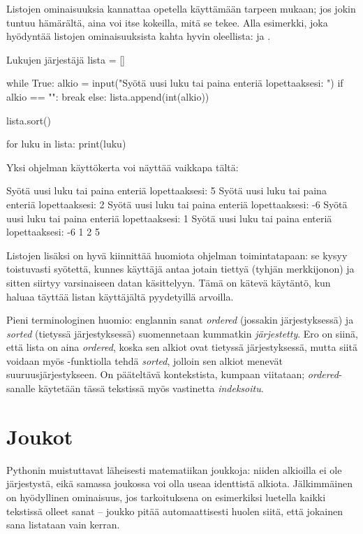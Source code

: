 Listojen ominaisuuksia kannattaa opetella käyttämään tarpeen mukaan; jos jokin tuntuu hämärältä, aina voi itse kokeilla, mitä se tekee. Alla esimerkki, joka hyödyntää listojen ominaisuuksista kahta hyvin oleellista:  ja .

\begin{example}{Lukujen järjestäjä}
lista = []

while True:
	alkio = input("Syötä uusi luku tai paina enteriä lopettaaksesi: ")
	if alkio == "":
		break
	else:
		lista.append(int(alkio))

lista.sort()

for luku in lista:
	print(luku)
\end{example}

Yksi ohjelman käyttökerta voi näyttää vaikkapa tältä:

\begin{output}
Syötä uusi luku tai paina enteriä lopettaaksesi: 5
Syötä uusi luku tai paina enteriä lopettaaksesi: 2
Syötä uusi luku tai paina enteriä lopettaaksesi: -6
Syötä uusi luku tai paina enteriä lopettaaksesi: 1
Syötä uusi luku tai paina enteriä lopettaaksesi: 
-6
1
2
5
\end{output}

Listojen lisäksi on hyvä kiinnittää huomiota ohjelman toimintatapaan: se kysyy toistuvasti syötettä, kunnes käyttäjä antaa jotain tiettyä (tyhjän merkkijonon) ja sitten siirtyy varsinaiseen datan käsittelyyn. Tämä on kätevä käytäntö, kun haluaa täyttää listan käyttäjältä pyydetyillä arvoilla.

Pieni terminologinen huomio: englannin sanat \textit{ordered} (jossakin järjestyksessä) ja \textit{sorted} (tietyssä järjestyksessä) suomennetaan kummatkin \textit{järjestetty}. Ero on siinä, että lista on aina \textit{ordered}, koska sen alkiot ovat tietyssä järjestyksessä, mutta siitä voidaan myös -funktiolla tehdä \textit{sorted}, jolloin sen alkiot menevät suuruusjärjestykseen. On pääteltävä kontekstista, kumpaan viitataan; \textit{ordered}-sanalle käytetään tässä tekstissä myös vastinetta \textit{indeksoitu}.

\section{Joukot}

Pythonin  muistuttavat läheisesti matematiikan joukkoja: niiden alkioilla ei ole järjestystä, eikä samassa joukossa voi olla useaa identtistä alkiota. Jälkimmäinen on hyödyllinen ominaisuus, jos tarkoituksena on esimerkiksi luetella kaikki tekstissä olleet sanat -- joukko pitää automaattisesti huolen siitä, että jokainen sana listataan vain kerran.

